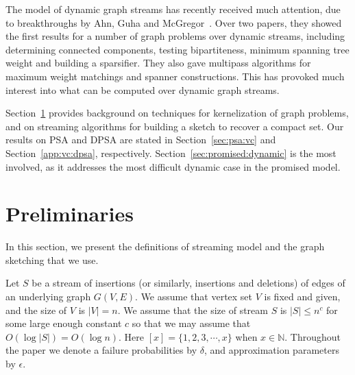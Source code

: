 \documentclass[11pt,letter]{article}
\renewcommand{\paragraph}[1]{\medskip \noindent {\bf #1}}
\newcommand{\NAT}{\ensuremath{\mathbb{N}}}
\newcommand{\NATURAL}{\NAT}
\begin{document}
The model of dynamic graph streams has recently received much attention,
due to breakthroughs by Ahn, Guha and
McGregor~\cite{AGM12a,Ahn:Guha:McGregor:12PODS}.
Over two papers, they showed the first results for a number of graph
problems over dynamic streams, including
determining connected components,
testing bipartiteness,
minimum spanning tree weight and building a sparsifier.
They also gave multipass algorithms for maximum weight matchings
and spanner constructions.
This has provoked much interest into what can be computed over dynamic
graph streams.



\paragraph{Outline.}
Section~\ref{sec:prelims} provides background on techniques for
kernelization of graph problems, and on streaming algorithms for
building a sketch to recover a compact set.
Our results on PSA and DPSA are stated in Section~\ref{sec:psa:vc}
and Section~\ref{app:vc:dpsa}, respectively.
Section~\ref{sec:promised:dynamic} is the most involved, as it addresses the most
difficult dynamic case in the promised model.





\section{Preliminaries}
\label{sec:prelims}



In this section, we present the definitions of streaming model and
the graph sketching that we use.







\paragraph{Streaming Model.}
Let $S$ be a stream of insertions (or similarly, insertions and deletions) of edges of an underlying graph
$G(V,E)$. We assume that vertex set $V$ is fixed and given, and the size of $V$
is $|V|=n$. We assume that the size of stream $S$ is $|S|\le n^c$ for some large
enough constant $c$ so that we may assume that
$O(\log|S|)=O(\log n)$.
Here $[x]=\{1,2,3,\cdots,x\}$ when $x\in \NATURAL$.
Throughout the paper we denote a failure probabilities by $\delta$, and
approximation parameters by $\epsilon$.
\end{document}
